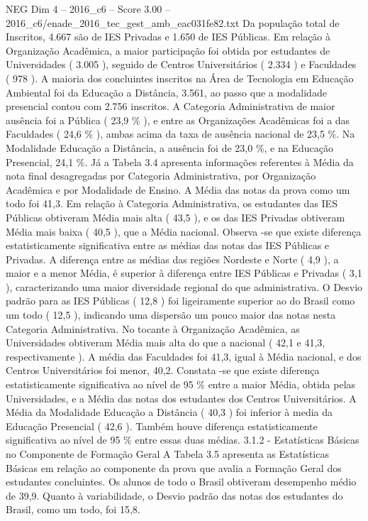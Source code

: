 \begin{textsample}{NEG Dim 4 – 2016\_c6 – Score 3.00 – 2016\_c6/enade\_2016\_tec\_gest\_amb\_eac031fe82.txt}
Da população total de Inscritos, 4.667 são de IES Privadas e 1.650 de IES Públicas.
Em relação à Organização Acadêmica, a maior participação foi obtida por estudantes de Universidades ( 3.005 ), seguido de Centros Universitários ( 2.334 ) e Faculdades ( 978 ).
A maioria dos concluintes inscritos na Área de Tecnologia em Educação Ambiental foi da Educação a Distância, 3.561, ao passo que a modalidade presencial contou com 2.756 inscritos.
A Categoria Administrativa de maior ausência foi a Pública ( 23,9 \% ), e entre as Organizações Acadêmicas foi a das Faculdades ( 24,6 \% ), ambas acima da taxa de ausência nacional de 23,5 \%.
Na Modalidade Educação a Distância, a ausência foi de 23,0 \%, e na Educação Presencial, 24,1 \%.
Já a Tabela 3.4 apresenta informações referentes à Média da nota final desagregadas por Categoria Administrativa, por Organização Acadêmica e por Modalidade de Ensino.
A Média das notas da prova como um todo foi 41,3.
Em relação à Categoria Administrativa, os estudantes das IES Públicas obtiveram Média mais alta ( 43,5 ), e os das IES Privadas obtiveram Média mais baixa ( 40,5 ), que a Média nacional.
Observa -se que existe diferença estatisticamente significativa entre as médias das notas das IES Públicas e Privadas.
A diferença entre as médias das regiões Nordeste e Norte ( 4,9 ), a maior e a menor Média, é superior à diferença entre IES Públicas e Privadas ( 3,1 ), caracterizando uma maior diversidade regional do que administrativa.
O Desvio padrão para as IES Públicas ( 12,8 ) foi ligeiramente superior ao do Brasil como um todo ( 12,5 ), indicando uma dispersão um pouco maior das notas nesta Categoria Administrativa.
No tocante à Organização Acadêmica, as Universidades obtiveram Média mais alta do que a nacional ( 42,1 e 41,3, respectivamente ).
A média das Faculdades foi 41,3, igual à Média nacional, e dos Centros Universitários foi menor, 40,2.
Constata -se que existe diferença estatisticamente significativa ao nível de 95 \% entre a maior Média, obtida pelas Universidades, e a Média das notas dos estudantes dos Centros Universitários.
A Média da Modalidade Educação a Distância ( 40,3 ) foi inferior à media da Educação Presencial ( 42,6 ).
Também houve diferença estatisticamente significativa ao nível de 95 \% entre essas duas médias. 3.1.2 - Estatísticas Básicas no Componente de Formação Geral A Tabela 3.5 apresenta as Estatísticas Básicas em relação ao componente da prova que avalia a Formação Geral dos estudantes concluintes.
Os alunos de todo o Brasil obtiveram desempenho médio de 39,9.
Quanto à variabilidade, o Desvio padrão das notas dos estudantes do Brasil, como um todo, foi 15,8.

\end{textsample}
